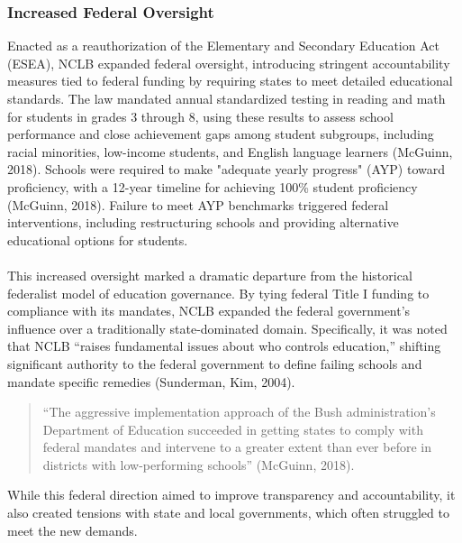 \documentclass[11pt]{extarticle}
\begin{document}
\subsubsection{Increased Federal Oversight}
Enacted as a reauthorization of the Elementary and Secondary Education Act (ESEA), NCLB expanded federal oversight, introducing stringent accountability measures tied to federal funding by requiring states to meet detailed educational standards. 
The law mandated annual standardized testing in reading and math for students in grades 3 through 8, using these results to assess school performance and close achievement gaps among student subgroups, including racial minorities, low-income students, and English language learners (McGuinn, 2018). Schools were required to make "adequate yearly progress" (AYP) toward proficiency, with a 12-year timeline for achieving 100\% student proficiency (McGuinn, 2018). Failure to meet AYP benchmarks triggered federal interventions, including restructuring schools and providing alternative educational options for students.\\
\\
This increased oversight marked a dramatic departure from the historical federalist model of education governance. By tying federal Title I funding to compliance with its mandates, NCLB expanded the federal government’s influence over a traditionally state-dominated domain. Specifically, it was noted that NCLB ``raises fundamental issues about who controls education,” shifting significant authority to the federal government to define failing schools and mandate specific remedies (Sunderman, Kim, 2004).
\begin{quote}
  ``The aggressive implementation approach of the Bush administration’s Department of Education succeeded in getting states to comply with federal mandates and intervene to a greater extent than ever before in districts with low-performing schools'' (McGuinn, 2018).
\end{quote}
While this federal direction aimed to improve transparency and accountability, it also created tensions with state and local governments, which often struggled to meet the new demands.
\end{document}

